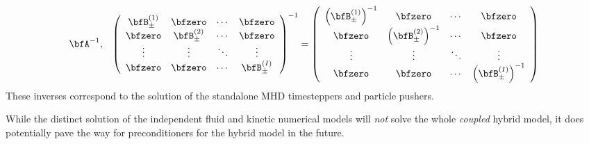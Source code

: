     \begin{align}
        \bfA^{- 1},  &&
        \left(\begin{array}{ c c c c }
            \bfB_{\pm}^{(1)}  &  \bfzero           &  \cdots  &  \bfzero           \\
            \bfzero           &  \bfB_{\pm}^{(2)}  &  \cdots  &  \bfzero           \\
            \vdots            &  \vdots            &  \ddots  &  \vdots            \\
            \bfzero           &  \bfzero           &  \cdots  &  \bfB_{\pm}^{(I)}  \\
        \end{array}\right)^{- 1}  =  \left(\begin{array}{ c c c c }
            \left(\bfB_{\pm}^{(1)}\right)^{- 1}  &  \bfzero                              &  \cdots  &  \bfzero                              \\
            \bfzero                              &  \left(\bfB_{\pm}^{(2)}\right)^{- 1}  &  \cdots  &  \bfzero                              \\
            \vdots                               &  \vdots                               &  \ddots  &  \vdots                               \\
            \bfzero                              &  \bfzero                              &  \cdots  &  \left(\bfB_{\pm}^{(I)}\right)^{- 1}  \\
        \end{array}\right)
    \end{align}
    These inverses correspond to the solution of the standalone MHD timesteppers and particle pushers.

    While the distinct solution of the independent fluid and kinetic numerical models will \emph{not} solve the whole \emph{coupled} hybrid model, it does potentially pave the way for preconditioners for the hybrid model in the future.
